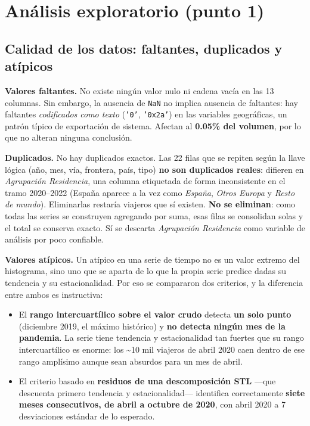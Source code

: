 \documentclass[12pt,letterpaper]{article}
\newcommand{\seccion}[1]{\section{#1}}
\newcommand{\subseccion}[1]{\subsection{#1}}
\begin{document}
\seccion{Análisis exploratorio (punto 1)}

\subseccion{Calidad de los datos: faltantes, duplicados y atípicos}

\textbf{Valores faltantes.} No existe ningún valor nulo ni cadena vacía en las 13 columnas. Sin
embargo, la ausencia de \texttt{NaN} no implica ausencia de faltantes: hay faltantes
\textit{codificados como texto} (\texttt{'0'}, \texttt{'0x2a'}) en las variables geográficas,
un patrón típico de exportación de sistema. Afectan al \textbf{0.05\% del volumen}, por lo que
no alteran ninguna conclusión.

\textbf{Duplicados.} No hay duplicados exactos. Las 22 filas que se repiten según la llave
lógica (año, mes, vía, frontera, país, tipo) \textbf{no son duplicados reales}: difieren en
\textit{Agrupación Residencia}, una columna etiquetada de forma inconsistente en el tramo
2020--2022 (España aparece a la vez como \textit{España}, \textit{Otros Europa} y
\textit{Resto de mundo}). Eliminarlas restaría viajeros que sí existen. \textbf{No se eliminan}:
como todas las series se construyen agregando por suma, esas filas se consolidan solas y el
total se conserva exacto. Sí se descarta \textit{Agrupación Residencia} como variable de
análisis por poco confiable.

\textbf{Valores atípicos.} Un atípico en una serie de tiempo no es un valor extremo del
histograma, sino uno que se aparta de lo que la propia serie predice dadas su tendencia y su
estacionalidad. Por eso se compararon dos criterios, y la diferencia entre ambos es
instructiva:

\begin{itemize}[leftmargin=1.4em,itemsep=2pt]
  \item El \textbf{rango intercuartílico sobre el valor crudo} detecta \textbf{un solo punto}
  (diciembre 2019, el máximo histórico) y \textbf{no detecta ningún mes de la pandemia}. La
  serie tiene tendencia y estacionalidad tan fuertes que su rango intercuartílico es enorme:
  los \textasciitilde10 mil viajeros de abril 2020 caen dentro de ese rango amplísimo aunque
  sean absurdos para un mes de abril.
  \item El criterio basado en \textbf{residuos de una descomposición STL} ---que descuenta
  primero tendencia y estacionalidad--- identifica correctamente \textbf{siete meses
  consecutivos, de abril a octubre de 2020}, con abril 2020 a 7 desviaciones estándar de lo
  esperado.
\end{itemize}
\end{document}
